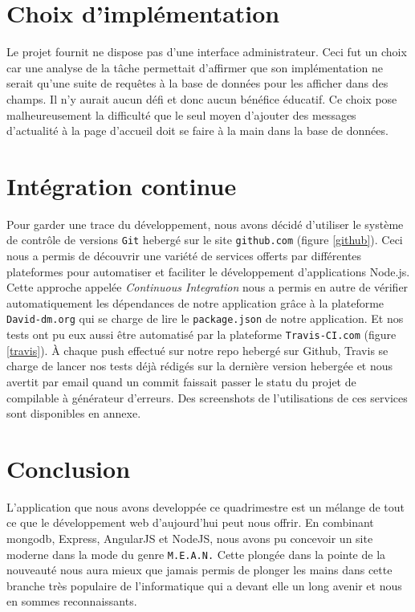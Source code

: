 \documentclass[a4paper,11pt]{article}
\begin{document}
\section{Choix d'implémentation}

Le projet fournit ne dispose pas d'une interface administrateur. Ceci fut un choix car une analyse de la tâche permettait d'affirmer que son implémentation ne serait qu'une suite de requêtes à la base de données pour les afficher dans des champs. Il n'y aurait aucun défi et donc aucun bénéfice éducatif. Ce choix pose malheureusement la difficulté que le seul moyen d'ajouter des messages d'actualité à la page d'accueil doit se faire à la main dans la base de données.

\section{Intégration continue}

Pour garder une trace du développement, nous avons décidé d'utiliser le système de contrôle de versions \texttt{Git} hebergé sur le site \texttt{github.com} (figure \ref{github}). Ceci nous a permis de découvrir une variété de services offerts par différentes plateformes pour automatiser et faciliter le développement d'applications Node.js. Cette approche appelée \textit{Continuous Integration} nous a permis en autre de vérifier automatiquement les dépendances de notre application grâce à la plateforme \texttt{David-dm.org} qui se charge de lire le \texttt{package.json} de notre application. Et nos tests ont pu eux aussi être automatisé par la plateforme \texttt{Travis-CI.com} (figure \ref{travis}). À chaque push effectué sur notre repo hebergé sur \textsf{Github}, \textsf{Travis} se charge de lancer nos tests déjà rédigés sur la dernière version hebergée et nous avertit par email quand un commit faissait passer le statu du projet de \textsf{compilable} à \textsf{générateur d'erreurs}. Des screenshots de l'utilisations de ces services sont disponibles en annexe.

\section{Conclusion}

L'application que nous avons developpée ce quadrimestre est un mélange de tout ce que le développement web d'aujourd'hui peut nous offrir. En combinant \textsf{mongodb}, \textsf{Express}, \textsf{AngularJS} et \textsf{NodeJS}, nous avons pu concevoir un site moderne dans la mode du genre \texttt{M.E.A.N.}
Cette plongée dans la pointe de la nouveauté nous aura mieux que jamais permis de plonger les mains dans cette branche très populaire de l'informatique qui a devant elle un long avenir et nous en sommes reconnaissants.
\end{document}

